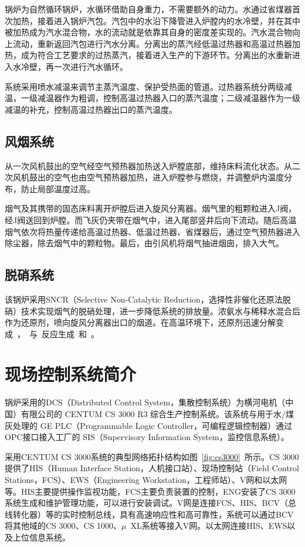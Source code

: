 锅炉为自然循环锅炉，水循环借助自身重力，不需要额外的动力。水通过省煤器首次加热，接着进入锅炉汽包。汽包中的水沿下降管进入炉膛内的水冷壁，并在其中被加热成为汽水混合物，水的流动就是依靠其自身的密度差实现的。汽水混合物向上流动，重新返回汽包进行汽水分离。分离出的蒸汽经低温过热器和高温过热器加热，成为符合工艺要求的过热蒸汽，接着进入生产的下游环节。分离出的水重新进入水冷壁，再一次进行汽水循环。

系统采用喷水减温来调节主蒸汽温度、保护受热面的管道。过热器系统分两级减温，一级减温器作为粗调，控制高温过热器入口的蒸汽温度；二级减温器作为一级减温的补充，控制高温过热器出口的蒸汽温度。

\subsection{风烟系统}

从一次风机鼓出的空气经空气预热器加热送入炉膛底部，维持床料流化状态。从二次风机鼓出的空气也由空气预热器加热，进入炉膛参与燃烧，并调整炉内温度分布，防止局部温度过高。

烟气及其携带的固态床料离开炉膛后进入旋风分离器。烟气里的粗颗粒进入J阀，经J阀送回到炉膛。而飞灰仍夹带在烟气中，进入尾部竖井后向下流动。随后高温烟气依次将热量传递给高温过热器、低温过热器、省煤器后，通过空气预热器进入除尘器，除去烟气中的颗粒物。最后，由引风机将烟气抽进烟囱，排入大气。

\subsection{脱硝系统}

该锅炉采用SNCR（Selective Non-Catalytic Reduction，选择性非催化还原法脱硝）技术实现烟气的脱硝处理，进一步降低系统的排放量。浓氨水与稀释水混合后作为还原剂，喷向旋风分离器出口的烟道。在高温环境下，还原剂迅速分解变成~，~与~反应生成~和~。

\section{现场控制系统简介}
锅炉采用的DCS（Distributed Control System，集散控制系统）为横河电机（中国）有限公司的 CENTUM CS 3000 R3 综合生产控制系统。该系统与用于水/煤灰处理的 GE PLC（Programmable Logic Controller，可编程逻辑控制器）通过OPC接口接入工厂的 SIS（Supervisory Information System，监控信息系统）。

采用CENTUM CS 3000系统的典型网络拓扑结构如图~\ref{fig:cs3000}~所示。CS 3000提供了HIS（Human Interface Station，人机接口站）、现场控制站（Field Control Stations，FCS）、EWS（Engineering Workstation，工程师站）、V网和以太网等\cite{konishi2000system}。HIS主要提供操作监视功能，FCS主要负责装置的控制，ENG安装了CS 3000系统生成和维护管理功能，可以进行安装调试。V网是连接FCS、HIS、BCV（总线转化器）等的实时控制总线，具有高速响应性和高可靠性，系统可以通过BCV将其他域的CS 3000、CS 1000、$\mu$~XL系统等接入V网。以太网连接HIS、EWS以及上位信息系统\cite{emori1997communication}。

